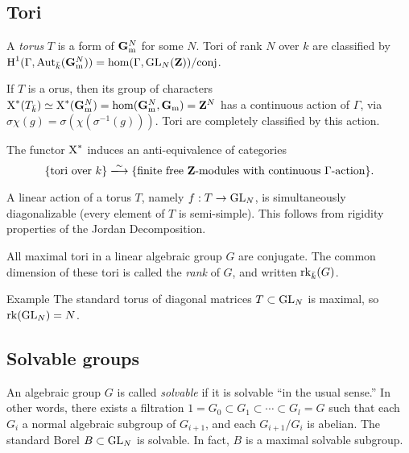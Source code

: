 \subsection{Tori}

A \emph{torus} $T$ is a form of $\mathbf{G}_{\mathrm{m}}^N$ for some $N$. Tori of 
rank $N$ over $k$ are classified by 
$\operatorname{H}^1(\Gamma,\operatorname{Aut}_{\bar k}(\mathbf{G}_{\mathrm{m}}^N)) = \hom(\Gamma,\operatorname{GL}_N(\mathbf{Z}))/\text{conj}$. 

If $T$ is a orus, then its group of characters 
$\operatorname{X}^\ast(T_{\bar k}) \simeq \operatorname{X}^\ast(\mathbf{G}_{\mathrm{m}}^N) = \hom(\mathbf{G}_{\mathrm{m}}^N,\mathbf{G}_{\mathrm{m}}) = \mathbf{Z}^N$ 
has a continuous action of $\Gamma$, via 
$\sigma \chi(g) = \sigma(\chi(\sigma^{-1}(g)))$. Tori are completely classified 
by this action. 

\begin{theo}
The functor $\operatorname{X}^\ast$ induces an anti-equivalence of categories 
\[
  \{\text{tori over }k\} \iso \{\text{finite free $\dZ$-modules with continuous $\Gamma$-action}\} .
\]
\end{theo}

A linear action of a torus $T$, namely $f:T\to \operatorname{GL}_N$, is 
simultaneously diagonalizable (every element of $T$ is semi-simple). This 
follows from rigidity properties of the Jordan Decomposition. 

All maximal tori in a linear algebraic group $G$ are conjugate. The common 
dimension of these tori is called the \emph{rank} of $G$, and written 
$\operatorname{rk}_{\bar k}(G)$. 

\begin{enonce}[remark]{Example}
The standard torus of diagonal matrices $T\subset\operatorname{GL}_N$ is 
maximal, so $\operatorname{rk}(\operatorname{GL}_N) = N$. 
\end{enonce}





\subsection{Solvable groups}

An algebraic group $G$ is called \emph{solvable} if it is solvable ``in the 
usual sense.'' In other words, there exists a filtration 
$1=G_0\subset G_1\subset \cdots \subset G_l = G$ such that each 
$G_i$ a normal algebraic subgroup of $G_{i+1}$, and each 
$G_{i+1}/G_i$ is abelian. The standard Borel $B\subset \operatorname{GL}_N$ is 
solvable. In fact, $B$ is a maximal solvable subgroup. 

